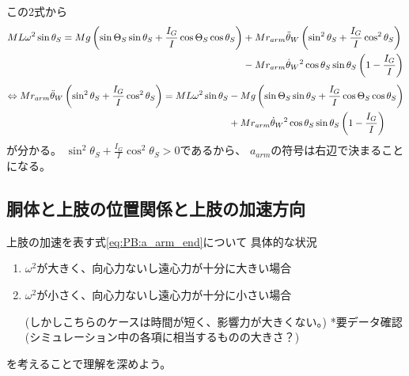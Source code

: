 \documentclass[a4paper,11pt]{jsarticle}
\begin{document}
この2式から
\begin{align*}
  ML\omega^2 \sin\theta_S
  = Mg\left( \sin\Theta_S \sin\theta_S + \frac{I_G}{I}\cos\Theta_S \cos\theta_S \right)
  & + Mr_{arm}\ddot{\theta}_W\left( \sin^2\theta_S + \frac{I_G}{I}\cos^2\theta_S \right)
  \notag
  \\
  & - Mr_{arm}\dot{\theta}_W{}^2\cos\theta_S \sin\theta_S\left( 1 - \frac{I_G}{I} \right)
\end{align*}
\begin{align}
  \Leftrightarrow
  Mr_{arm}\ddot{\theta}_W\left( \sin^2\theta_S + \frac{I_G}{I}\cos^2\theta_S \right)
  = ML\omega^2 \sin\theta_S
  &- Mg\left( \sin\Theta_S \sin\theta_S + \frac{I_G}{I}\cos\Theta_S \cos\theta_S \right)
  \notag
  \\
  &+ Mr_{arm}\dot{\theta}_W{}^2\cos\theta_S \sin\theta_S\left( 1 - \frac{I_G}{I} \right)
  \label{eq:PB:a_arm_end}
\end{align}
が分かる。
$\sin^2\theta_S + \frac{I_G}{I}\cos^2\theta_S > 0$であるから、
$a_{arm}$の符号は右辺で決まることになる。

\subsection{胴体と上肢の位置関係と上肢の加速方向}

上肢の加速を表す式\ref{eq:PB:a_arm_end}について
具体的な状況
\begin{enumerate}
  \item $\omega^2$が大きく、向心力ないし遠心力が十分に大きい場合
  \item $\omega^2$が小さく、向心力ないし遠心力が十分に小さい場合
  
  (しかしこちらのケースは時間が短く、影響力が大きくない。)
  *要データ確認(シミュレーション中の各項に相当するものの大きさ？)
\end{enumerate}
を考えることで理解を深めよう。
\end{document}
